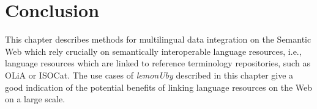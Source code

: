 \section{Conclusion}

This chapter describes methods for multilingual data integration on the Semantic Web which  rely 
crucially on semantically interoperable language resources, i.e., language resources which are linked to reference
terminology repositories, such as OLiA or ISOCat.
The use cases of \emph{lemonUby} described in this chapter give a good indication of the
potential benefits of linking language resources on the Web on a large scale.
